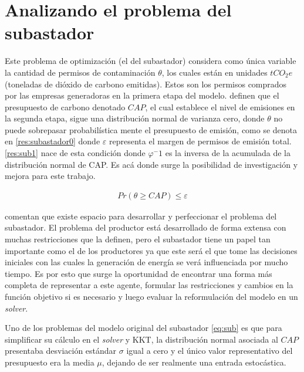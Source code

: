 \section{Analizando el problema del subastador}

Este problema de optimización (el del subastador) considera como única variable la cantidad de permisos de contaminación $\theta$, los cuales están en unidades $tCO_2 e$ (toneladas de dióxido de carbono emitidas). Estos son los permisos comprados por las empresas generadoras en la primera etapa del modelo.  definen que el presupuesto de carbono denotado $CAP$, el cual establece el nivel de emisiones en la segunda etapa, sigue una distribución normal de varianza cero, donde $\theta$ no puede sobrepasar probabilística mente el presupuesto de emisión, como se denota en \ref{res:subastador0} donde $\varepsilon$ representa el margen de permisos de emisión total. \ref{res:sub1} nace de esta condición donde $\varphi^-1$ es la inversa de la acumulada de la distribución normal de CAP. Es acá donde surge la posibilidad de investigación y mejora para este trabajo. 
\vspace{2.5mm}

\begin{equation}
\begin{array}{cl}
    Pr(\theta \geq CAP)\leq \varepsilon \label{res:subastador0}
\end{array}
\end{equation}
\vspace{2.5mm}

 comentan que existe espacio para desarrollar y perfeccionar el problema del subastador. El problema del productor está desarrollado de forma extensa con muchas restricciones que la definen, pero el subastador tiene un papel tan importante como el de los productores ya que este será el que tome las decisiones iniciales con las cuales la generación de energía se verá influenciada por mucho tiempo.  Es por esto que surge la oportunidad de encontrar una forma más completa de representar a este agente, formular las restricciones y cambios en la función objetivo si es necesario y luego evaluar la reformulación del modelo en un \textit{solver}.
\vspace{2.5mm}

Uno de los problemas del modelo original del subastador \ref{eq:sub} es que para simplificar su cálculo en el \textit{solver} y KKT, la distribución normal asociada al $CAP$ presentaba desviación estándar $\sigma$ igual a cero y el único valor representativo del presupuesto era la media $\mu$, dejando de ser realmente una entrada estocástica. 
\vspace{2.5mm}

